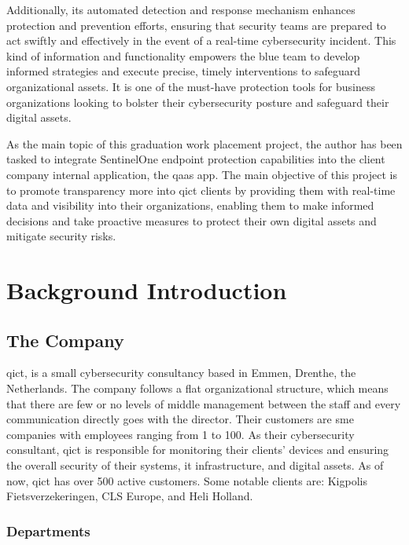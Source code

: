 Additionally, its automated detection and response mechanism enhances protection and prevention efforts, ensuring that security teams
are prepared to act swiftly and effectively in the event of a real-time cybersecurity incident. This kind of information and functionality
empowers the blue team to develop informed strategies and execute precise, timely interventions to safeguard organizational assets. It is
one of the must-have protection tools for business organizations looking to bolster their cybersecurity posture and safeguard their digital
assets.

As the main topic of this graduation work placement project, the author
has been tasked to integrate SentinelOne endpoint protection capabilities into the client company internal
application, the \acrshort{qaas} app. The main objective of this project is to promote transparency more
into \acrshort{qict} clients by providing them with real-time data and visibility into their organizations,
enabling them to make informed decisions and take proactive measures to protect their own digital assets and
mitigate security risks.

\section{Background Introduction}

\subsection{The Company}

\acrshort{qict}, is a small cybersecurity consultancy based in Emmen, Drenthe, the Netherlands. The company follows
a flat organizational structure, which means that there are few or no levels of middle management between the staff and
every communication directly goes with the director. Their customers are \acrshort{sme} companies with employees ranging
from 1 to 100. As their cybersecurity consultant, \acrshort{qict} is responsible for monitoring their clients' devices and
ensuring the overall security of their systems, \acrshort{it} infrastructure, and digital assets. As of now, \acrshort{qict}
has over 500 active customers. Some notable clients are: Kigpolis Fietsverzekeringen, CLS Europe, and Heli Holland.

\subsubsection{Departments}

